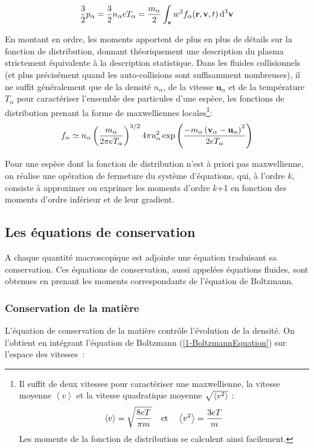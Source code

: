 \begin{refsection}
\begin{equation}
\frac{3}{2}p_\alpha=\frac{3}{2}n_\alpha
eT_\alpha=\frac{m_\alpha}{2}\int_{\mathbf v} w^{{2}} f_\alpha(\mathbf
r,\mathbf v,t) \,\text{d}^{{3}}\mathbf{v}
\end{equation}

En montant en ordre, les moments apportent de plus en plus de détails sur la
fonction de distribution, donnant théoriquement une description du plasma
strictement équivalente à la description statistique. Dans les fluides
collisionnels (et plus précisément quand les auto-collisions sont suffisamment
nombreuses), il ne suffit généralement que de la densité $n_\alpha$, de la
vitesse $\mathbf{u}_\alpha$ et de la température $T_\alpha$ pour caractériser l'ensemble des particules d'une espèce, les fonctions de distribution
prenant la forme de maxwelliennes locales\footnote{Il suffit de deux vitesses
pour caractériser une maxwellienne, la vitesse moyenne $\left<v\right>$ et la vitesse quadratique moyenne $\sqrt{\left<v^{{2}}\right>}$ :
$$
	\left<v\right>=\sqrt{\frac{8eT}{\pi m}} \;\;\;\;\text{et}\;\;\;\; 
	\left<v^{{2}}\right>=\frac{3eT}{m}
$$ 
Les moments de la fonction de distribution se calculent ainsi facilement.}:
\begin{equation}
\label{1-MaxwellDistribution}
	f_\alpha\simeq n_\alpha
	\left(\frac{m_\alpha}{2\pi
	eT_\alpha}\right)^{{3/2}}4\pi
	u_\alpha^{{2}}\exp\left(\frac{-m_\alpha \left(\mathbf
	v_\alpha-\mathbf u_\alpha\right)^{{2}}}{2eT_\alpha}\right)
\end{equation}

Pour une espèce dont la fonction de distribution n'est à priori pas
maxwellienne, on réalise une opération de fermeture du système d'équations, qui,
à l'ordre $k$, consiste à approximer ou exprimer les moments d'ordre $k$+1
en fonction des moments d'ordre inférieur et de leur gradient.

\subsection{Les équations de conservation}

A chaque quantité macroscopique est adjointe une équation traduisant sa
conservation. Ces équations de conservation, aussi appelées équations fluides,
sont obtenues en prenant les moments correspondants de l'équation de Boltzmann.

\subsubsection{Conservation de la matière}
L'équation de conservation de la matière contrôle
l'évolution de la densité. On l'obtient en intégrant
l'équation de Boltzmann (\eqref{1-BoltzmannEquation}) sur l'espace des
vitesses~:


\end{refsection}
